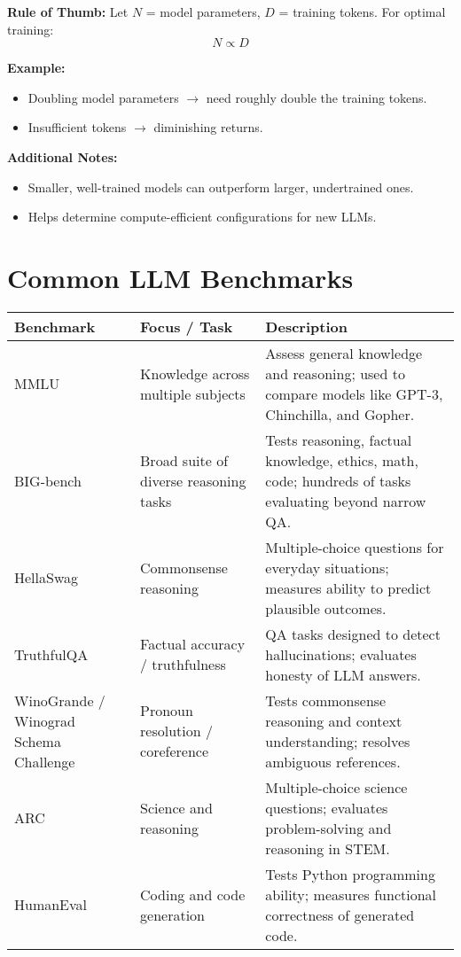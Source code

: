 \documentclass[a4paper, 12pt]{article}
\begin{document}
\textbf{Rule of Thumb:} Let $N$ = model parameters, $D$ = training tokens. For optimal training:
\[
N \propto D
\]

\textbf{Example:}
\begin{itemize}
    \item Doubling model parameters $\rightarrow$ need roughly double the training tokens.
    \item Insufficient tokens $\rightarrow$ diminishing returns.
\end{itemize}

\textbf{Additional Notes:}
\begin{itemize}
    \item Smaller, well-trained models can outperform larger, undertrained ones.
    \item Helps determine compute-efficient configurations for new LLMs.
\end{itemize}

\vspace{1em}

\section*{Common LLM Benchmarks}

\begin{tabularx}{\textwidth}{|>{\hsize=0.2\hsize}X|>{\hsize=0.3\hsize}X|>{\hsize=0.5\hsize}X|}
\hline
\textbf{Benchmark} & \textbf{Focus / Task} & \textbf{Description} \\
\hline
MMLU & Knowledge across multiple subjects & Assess general knowledge and reasoning; used to compare models like GPT-3, Chinchilla, and Gopher. \\
\hline
BIG-bench & Broad suite of diverse reasoning tasks & Tests reasoning, factual knowledge, ethics, math, code; hundreds of tasks evaluating beyond narrow QA. \\
\hline
HellaSwag & Commonsense reasoning & Multiple-choice questions for everyday situations; measures ability to predict plausible outcomes. \\
\hline
TruthfulQA & Factual accuracy / truthfulness & QA tasks designed to detect hallucinations; evaluates honesty of LLM answers. \\
\hline
WinoGrande / Winograd Schema Challenge & Pronoun resolution / coreference & Tests commonsense reasoning and context understanding; resolves ambiguous references. \\
\hline
ARC & Science and reasoning & Multiple-choice science questions; evaluates problem-solving and reasoning in STEM. \\
\hline
HumanEval & Coding and code generation & Tests Python programming ability; measures functional correctness of generated code. \\
\hline
\end{tabularx}
\end{document}
